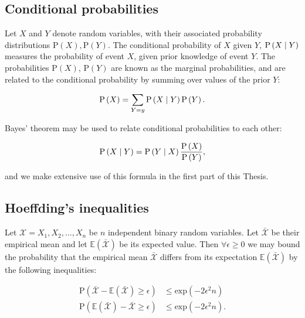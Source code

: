 \FloatBarrier
\subsection{Conditional probabilities}
Let $X$ and $Y$ denote random variables, with their associated probability distributions $\text{P}\left(X\right), \text{P}\left(Y\right)$. The conditional probability of $X$ given $Y$, $\text{P}\left(X \; \middle| \; Y\right)$ measures the probability of event $X$, given prior knowledge of event $Y$. The probabilities $\text{P}\left(X\right)$, $\text{P}\left(Y\right)$ are known as the marginal probabilities, and are related to the conditional probability by summing over values of the prior $Y$:

\begin{equation}
\text{P}\left(X\right) = \sum_{Y=y} \text{P}\left(X \; \middle| \; Y\right) \text{P}\left(Y\right).
\end{equation}

\noindent Bayes' theorem may be used to relate conditional probabilities to each other:

\begin{equation}\label{eqn:intro_bayes}
\text{P}\left(X \; \middle| \; Y\right) = \text{P}\left(Y \; \middle| \; X\right) \frac{\text{P}\left(X\right)}{\text{P}\left(Y\right)},
\end{equation}

\noindent and we make extensive use of this formula in the first part of this Thesis.

\FloatBarrier
\subsection{Hoeffding's inequalities}
Let $\mathcal{X} = X_1, X_2, \dots, X_n$ be $n$ independent binary random variables. Let $\bar{\mathcal{X}}$ be their empirical mean and let $\mathbb{E}\left(\bar{\mathcal{X}}\right)$ be its expected value. Then $\forall \epsilon \ge 0$ we may bound the probability that the empirical mean $\bar{\mathcal{X}}$ differs from its expectation $\mathbb{E}\left(\bar{\mathcal{X}}\right)$ by the following inequalities:

\begin{align}
\label{eqn:hoeffding1}
\text{P}\left(\bar{\mathcal{X}} - \mathbb{E}\left(\bar{\mathcal{X}}\right) \ge \epsilon\right) &\le \text{exp}\left(- 2 \epsilon^2 n\right) \\
\label{eqn:hoeffding2}
\text{P}\left(\mathbb{E}\left(\bar{\mathcal{X}}\right) - \bar{\mathcal{X}} \ge \epsilon\right) &\le \text{exp}\left(- 2 \epsilon^2 n\right).
\end{align}



